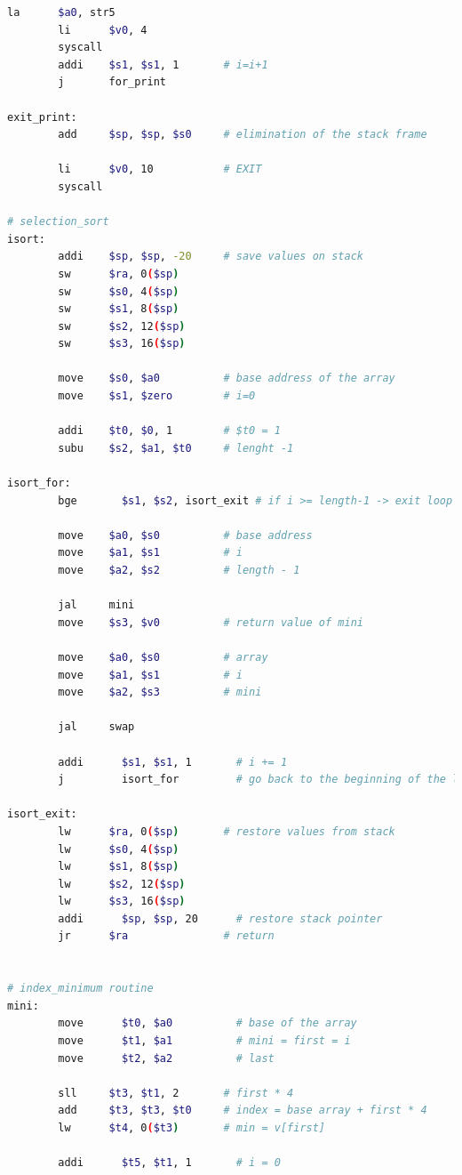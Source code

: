 \documentclass[11pt]{SEU-Digital-Report}
\begin{document}
\begin{lstlisting}[language=sh,tabsize=2,morekeywords={
        j,la,li,syscall,move,sll,sub,bge,sll,add,sw,addi,jal,ls,subu,jr,lw,bgt,bne,lbu,lb,sb
      },title={sort.s}]
        la	    $a0, str5
        li	    $v0, 4
        syscall
        addi    $s1, $s1, 1       # i=i+1
        j       for_print

exit_print:
        add     $sp, $sp, $s0     # elimination of the stack frame
              
        li	    $v0, 10           # EXIT
        syscall
        
# selection_sort
isort:
        addi    $sp, $sp, -20     # save values on stack
        sw      $ra, 0($sp)
        sw      $s0, 4($sp)
        sw      $s1, 8($sp)
        sw      $s2, 12($sp)
        sw      $s3, 16($sp)

        move    $s0, $a0          # base address of the array
        move    $s1, $zero        # i=0

        addi    $t0, $0, 1        # $t0 = 1
        subu    $s2, $a1, $t0     # lenght -1

isort_for:
        bge 	  $s1, $s2, isort_exit # if i >= length-1 -> exit loop
        
        move    $a0, $s0          # base address
        move    $a1, $s1          # i
        move    $a2, $s2          # length - 1
        
        jal	    mini
        move    $s3, $v0          # return value of mini
        
        move    $a0, $s0          # array
        move    $a1, $s1          # i
        move    $a2, $s3          # mini
        
        jal	    swap

        addi	  $s1, $s1, 1       # i += 1
        j	      isort_for         # go back to the beginning of the loop
        
isort_exit:
        lw	    $ra, 0($sp)       # restore values from stack
        lw	    $s0, 4($sp)
        lw	    $s1, 8($sp)
        lw	    $s2, 12($sp)
        lw	    $s3, 16($sp)
        addi	  $sp, $sp, 20      # restore stack pointer
        jr	    $ra               # return


# index_minimum routine
mini:
        move	  $t0, $a0          # base of the array
        move	  $t1, $a1          # mini = first = i
        move	  $t2, $a2          # last
        
        sll	    $t3, $t1, 2       # first * 4
        add	    $t3, $t3, $t0     # index = base array + first * 4
        lw	    $t4, 0($t3)       # min = v[first]
        
        addi	  $t5, $t1, 1       # i = 0


\end{lstlisting}
\end{document}
